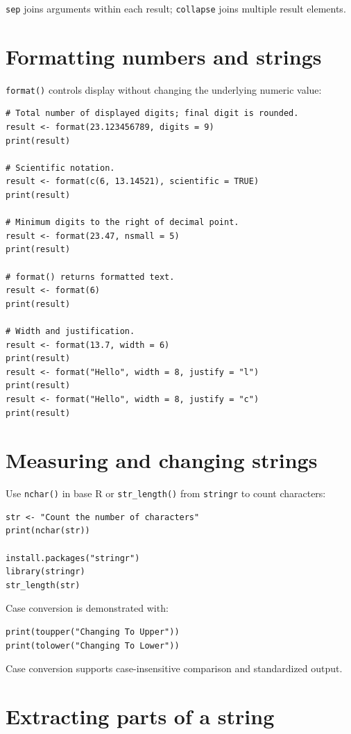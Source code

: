 \texttt{sep} joins arguments within each result; \texttt{collapse} joins multiple result elements.

\section{Formatting numbers and strings}

\texttt{format()} controls display without changing the underlying numeric value:

\begin{lstlisting}[style=dsr]
# Total number of displayed digits; final digit is rounded.
result <- format(23.123456789, digits = 9)
print(result)

# Scientific notation.
result <- format(c(6, 13.14521), scientific = TRUE)
print(result)

# Minimum digits to the right of decimal point.
result <- format(23.47, nsmall = 5)
print(result)

# format() returns formatted text.
result <- format(6)
print(result)

# Width and justification.
result <- format(13.7, width = 6)
print(result)
result <- format("Hello", width = 8, justify = "l")
print(result)
result <- format("Hello", width = 8, justify = "c")
print(result)
\end{lstlisting}

\section{Measuring and changing strings}

Use \texttt{nchar()} in base R or \texttt{str\_length()} from \texttt{stringr} to count characters:

\begin{lstlisting}[style=dsr]
str <- "Count the number of characters"
print(nchar(str))

install.packages("stringr")
library(stringr)
str_length(str)
\end{lstlisting}

Case conversion is demonstrated with:

\begin{lstlisting}[style=dsr]
print(toupper("Changing To Upper"))
print(tolower("Changing To Lower"))
\end{lstlisting}

Case conversion supports case-insensitive comparison and standardized output.

\section{Extracting parts of a string}


